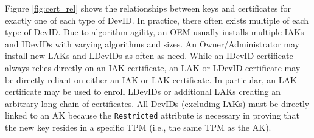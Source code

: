 Figure \ref{fig:cert_rel} shows the relationships between keys and certificates for exactly one of each type of DevID. In practice, there often exists multiple of each type of DevID. Due to algorithm agility, an OEM usually installs multiple IAKs and IDevIDs with varying algorithms and sizes. An Owner/Administrator may install new LAKs and LDevIDs as often as need. While an IDevID certificate always relies directly on an IAK certificate, an LAK or LDevID certificate may be directly reliant on either an IAK or LAK certificate. In particular, an LAK certificate may be used to enroll LDevIDs or additional LAKs creating an arbitrary long chain of certificates. All DevIDs (excluding IAKs) must be directly linked to an AK because the \verb|Restricted| attribute is necessary in proving that the new key resides in a specific TPM (i.e., the same TPM as the AK).

